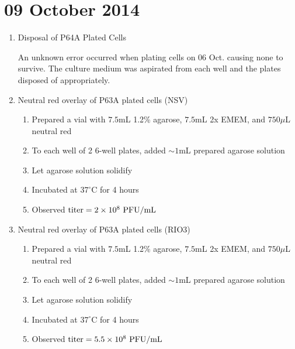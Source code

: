 
% 
% 
% 

\section*{09 October 2014}

\begin{enumerate}
	\item Disposal of P64A Plated Cells
	
	An unknown error occurred when plating cells on 06 Oct. causing none to survive. The culture medium was aspirated from each well and the plates disposed of appropriately.
	
	\item Neutral red overlay of P63A plated cells (NSV)
		\begin{enumerate}
			\item Prepared a vial with $7.5$mL 1.2\% agarose, $7.5$mL 2x EMEM, and $750\mu$L neutral red
			\item To each well of 2 6-well plates, added $\sim 1$mL prepared agarose solution
			\item Let agarose solution solidify
			\item Incubated at $37^{\circ}$C for 4 hours
			\item Observed $\text{titer}=2\times 10^{8}\text{ PFU/mL}$
		\end{enumerate}
	\item Neutral red overlay of P63A plated cells (RIO3)
		\begin{enumerate}
			\item Prepared a vial with $7.5$mL 1.2\% agarose, $7.5$mL 2x EMEM, and $750\mu$L neutral red
			\item To each well of 2 6-well plates, added $\sim 1$mL prepared agarose solution
			\item Let agarose solution solidify
			\item Incubated at $37^{\circ}$C for 4 hours
			\item Observed $\text{titer}=5.5\times 10^{8}\text{ PFU/mL}$
		\end{enumerate}


\end{enumerate}
